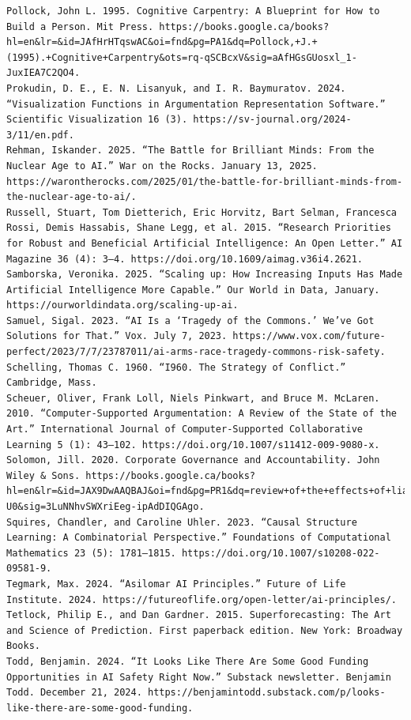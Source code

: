 \documentclass[
  11pt,
  letterpaper,
]{book}
\begin{document}
\begin{verbatim}
Pollock, John L. 1995. Cognitive Carpentry: A Blueprint for How to Build a Person. Mit Press. https://books.google.ca/books?hl=en&lr=&id=JAfHrHTqswAC&oi=fnd&pg=PA1&dq=Pollock,+J.+(1995).+Cognitive+Carpentry&ots=rq-qSCBcxV&sig=aAfHGsGUosxl_1-JuxIEA7C2QO4.
Prokudin, D. E., E. N. Lisanyuk, and I. R. Baymuratov. 2024. “Visualization Functions in Argumentation Representation Software.” Scientific Visualization 16 (3). https://sv-journal.org/2024-3/11/en.pdf.
Rehman, Iskander. 2025. “The Battle for Brilliant Minds: From the Nuclear Age to AI.” War on the Rocks. January 13, 2025. https://warontherocks.com/2025/01/the-battle-for-brilliant-minds-from-the-nuclear-age-to-ai/.
Russell, Stuart, Tom Dietterich, Eric Horvitz, Bart Selman, Francesca Rossi, Demis Hassabis, Shane Legg, et al. 2015. “Research Priorities for Robust and Beneficial Artificial Intelligence: An Open Letter.” AI Magazine 36 (4): 3–4. https://doi.org/10.1609/aimag.v36i4.2621.
Samborska, Veronika. 2025. “Scaling up: How Increasing Inputs Has Made Artificial Intelligence More Capable.” Our World in Data, January. https://ourworldindata.org/scaling-up-ai.
Samuel, Sigal. 2023. “AI Is a ‘Tragedy of the Commons.’ We’ve Got Solutions for That.” Vox. July 7, 2023. https://www.vox.com/future-perfect/2023/7/7/23787011/ai-arms-race-tragedy-commons-risk-safety.
Schelling, Thomas C. 1960. “I960. The Strategy of Conflict.” Cambridge, Mass.
Scheuer, Oliver, Frank Loll, Niels Pinkwart, and Bruce M. McLaren. 2010. “Computer-Supported Argumentation: A Review of the State of the Art.” International Journal of Computer-Supported Collaborative Learning 5 (1): 43–102. https://doi.org/10.1007/s11412-009-9080-x.
Solomon, Jill. 2020. Corporate Governance and Accountability. John Wiley & Sons. https://books.google.ca/books?hl=en&lr=&id=JAX9DwAAQBAJ&oi=fnd&pg=PR1&dq=review+of+the+effects+of+liability+frameworks+on+corporate+governance+&ots=ny23_vd-U0&sig=3LuNNhvSWXriEeg-ipAdDIQGAgo.
Squires, Chandler, and Caroline Uhler. 2023. “Causal Structure Learning: A Combinatorial Perspective.” Foundations of Computational Mathematics 23 (5): 1781–1815. https://doi.org/10.1007/s10208-022-09581-9.
Tegmark, Max. 2024. “Asilomar AI Principles.” Future of Life Institute. 2024. https://futureoflife.org/open-letter/ai-principles/.
Tetlock, Philip E., and Dan Gardner. 2015. Superforecasting: The Art and Science of Prediction. First paperback edition. New York: Broadway Books.
Todd, Benjamin. 2024. “It Looks Like There Are Some Good Funding Opportunities in AI Safety Right Now.” Substack newsletter. Benjamin Todd. December 21, 2024. https://benjamintodd.substack.com/p/looks-like-there-are-some-good-funding.

\end{verbatim}
\end{document}
